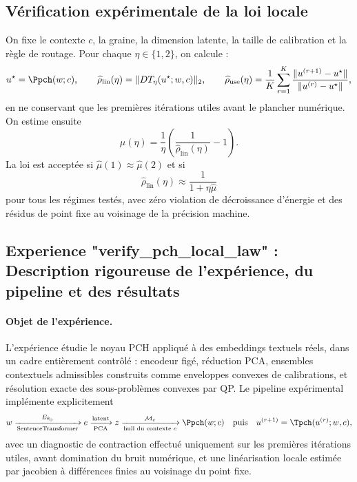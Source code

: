 
\subsection{Vérification expérimentale de la loi locale}
On fixe le contexte \(c\), la graine, la dimension latente, la taille de calibration et la règle de routage.
Pour chaque \(\eta\in\{1,2\}\), on calcule :
\[
u^\star=\Ppch(w;c),\qquad
\widehat\rho_{\mathrm{lin}}(\eta)=\|DT_\eta(u^\star;w,c)\|_2,
\qquad
\widehat\rho_{\mathrm{use}}(\eta)=\frac{1}{K}\sum_{r=1}^K
\frac{\|u^{(r+1)}-u^\star\|}{\|u^{(r)}-u^\star\|},
\]
en ne conservant que les premières itérations utiles avant le plancher numérique.
On estime ensuite
\[
\widehat\mu(\eta)=\frac{1}{\eta}\left(\frac{1}{\widehat\rho_{\mathrm{lin}}(\eta)}-1\right).
\]
La loi est acceptée si \(\widehat\mu(1)\approx \widehat\mu(2)\) et si
\[
\widehat\rho_{\mathrm{lin}}(\eta)\approx \frac{1}{1+\eta\widehat\mu}
\]
pour tous les régimes testés, avec zéro violation de décroissance d’énergie et des résidus de point fixe au voisinage de la précision machine.







\subsection{Experience "verify_pch_local_law" : Description rigoureuse de l'expérience, du pipeline et des résultats}

\paragraph{Objet de l'expérience.}
L'expérience étudie le noyau PCH appliqué à des embeddings textuels réels, dans un cadre entièrement contrôlé : encodeur figé, réduction PCA, ensembles contextuels admissibles construits comme enveloppes convexes de calibrations, et résolution exacte des sous-problèmes convexes par QP. Le pipeline expérimental implémente explicitement
\[
w \xrightarrow[\text{SentenceTransformer}]{E_{\theta_0}}
e \xrightarrow[\text{PCA}]{\text{latent}}
z \xrightarrow[\text{hull du contexte } c]{\mathcal M_c}
\Ppch(w;c)
\quad\text{puis}\quad
u^{(r+1)}=\Tpch(u^{(r)};w,c),
\]
avec un diagnostic de contraction effectué uniquement sur les premières itérations utiles, avant domination du bruit numérique, et une linéarisation locale estimée par jacobien à différences finies au voisinage du point fixe.

